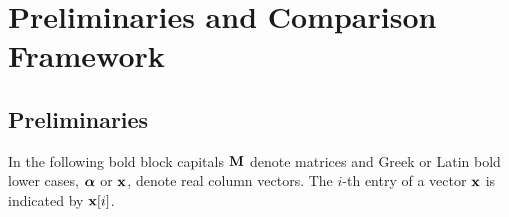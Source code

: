 \section{Preliminaries and Comparison Framework}\label{sec:preliminaries}





\subsection{Preliminaries}
In the following bold block capitals $\textbf{M}$ denote matrices and Greek or Latin bold lower cases, $\boldsymbol\alpha$ or   $\textbf{x}$, denote real column vectors. The $i$-th entry of a vector $\textbf{x}$ is indicated by $\textbf{x}[i]$.\\

